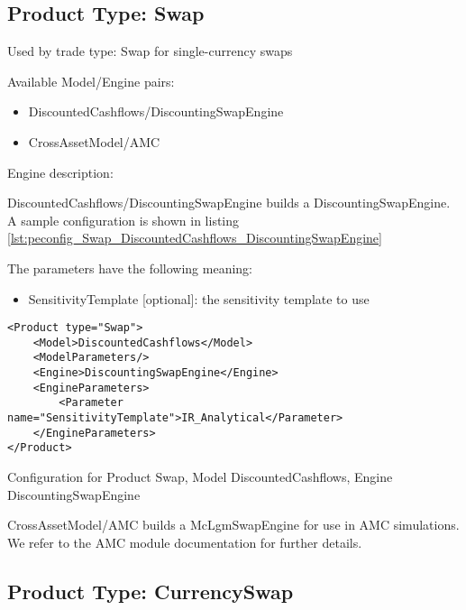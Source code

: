 \subsection{Product Type: Swap}

Used by trade type: Swap for single-currency swaps

Available Model/Engine pairs:

\begin{itemize}
\item DiscountedCashflows/DiscountingSwapEngine
\item CrossAssetModel/AMC
\end{itemize}

Engine description:

DiscountedCashflows/DiscountingSwapEngine builds a DiscountingSwapEngine. A sample configuration is shown in listing
\ref{lst:peconfig_Swap_DiscountedCashflows_DiscountingSwapEngine}

The parameters have the following meaning:

\begin{itemize}
\item SensitivityTemplate [optional]: the sensitivity template to use 
\end{itemize}

\begin{longlisting}
\begin{verbatim}
<Product type="Swap">
    <Model>DiscountedCashflows</Model>
    <ModelParameters/>
    <Engine>DiscountingSwapEngine</Engine>
    <EngineParameters>
        <Parameter name="SensitivityTemplate">IR_Analytical</Parameter>
    </EngineParameters>
</Product>
\end{verbatim}
\caption{Configuration for Product Swap, Model DiscountedCashflows, Engine DiscountingSwapEngine}
\label{lst:peconfig_Swap_DiscountedCashflows_DiscountingSwapEngine}
\end{longlisting}

CrossAssetModel/AMC builds a McLgmSwapEngine for use in AMC simulations. We refer to the AMC module documentation for
further details.

\subsection{Product Type: CurrencySwap}


